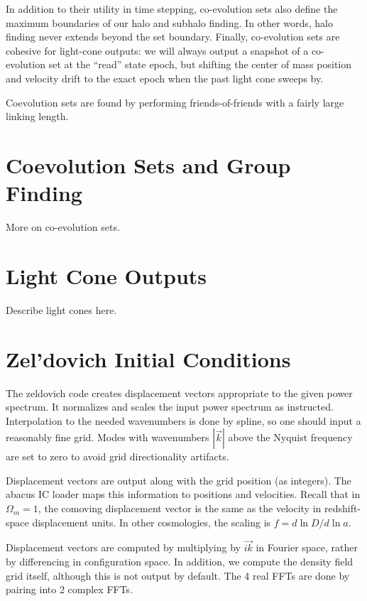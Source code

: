 \documentclass[11pt,preprint]{aastex}
\begin{document}
In addition to their utility in time stepping, co-evolution sets
also define the maximum boundaries of our halo and subhalo finding.
In other words, halo finding never extends beyond the set boundary.
Finally, co-evolution sets are cohesive for light-cone outputs: we
will always output a snapshot of a co-evolution set at the ``read''
state epoch, but shifting the center of mass position and velocity
drift to the exact epoch when the past light cone sweeps by.

Coevolution sets are found by performing friends-of-friends with a
fairly large linking length.

\section{Coevolution Sets and Group Finding}

More on co-evolution sets.

\section{Light Cone Outputs}

Describe light cones here.

\section{Zel'dovich Initial Conditions}

The zeldovich code creates displacement vectors appropriate to 
the given power spectrum.  It normalizes and scales the input
power spectrum as instructed.  Interpolation to the needed wavenumbers
is done by spline, so one should input a reasonably fine grid.
Modes with wavenumbers $|\vec{k}|$ above the Nyquist frequency are
set to zero to avoid grid directionality artifacts.

Displacement vectors are output along with the grid position (as
integers).  The abacus IC loader maps this information to positions
and velocities.  Recall that in $\Omega_m=1$, the comoving displacement
vector is the same as the velocity in redshift-space displacement
units.  In other cosmologies, the scaling is $f = d\ln D/d\ln a$.

Displacement vectors are computed by multiplying by $\vec{ik}$ in
Fourier space, rather by differencing in configuration space.  In
addition, we compute the density field grid itself, although this
is not output by default.  The 4 real FFTs are done by pairing into
2 complex FFTs.
\end{document}
